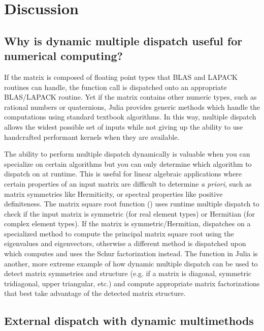 \section{Discussion}

\subsection{Why is dynamic multiple dispatch useful for numerical computing?}

If the matrix is composed of floating point types that BLAS and
LAPACK routines can handle, the function call is dispatched onto an
appropriate BLAS/LAPACK routine. Yet if the matrix contains other
numeric types, such as rational numbers or quaternions, Julia provides
generic methods which handle the computations using standard textbook
algorithms. In this way, multiple dispatch allows the widest possible
set of inputs while not giving up the ability to use handcrafted
performant kernels when they are available.

The ability to perform multiple dispatch dynamically is valuable
when you can specialize on certain algorithms but you can only
determine which algorithm to dispatch on at runtime. This is useful
for linear algebraic applications where certain properties of an input
matrix are difficult to determine \textit{a priori}, such as matrix
symmetries like Hermiticity, or spectral properties like positive
definiteness. The matrix square root function () uses
runtime multiple dispatch to check if the input matrix is symmetric
(for real element types) or Hermitian (for complex element types). If
the matrix is symmetric/Hermitian,  dispatches on a
specialized method to compute the principal matrix square root using
the eigenvalues and eigenvectors, otherwise a different method is
dispatched upon which computes and uses the Schur factorization
instead. The  function in Julia is another, more
extreme example of how dynamic multiple dispatch can be used to detect
matrix symmetries and structure (e.g. if a matrix is diagonal,
symmetric tridiagonal, upper triangular, etc.) and compute appropriate
matrix factorizations that best take advantage of the detected matrix
structure.


\subsection{External dispatch with dynamic multimethods}

